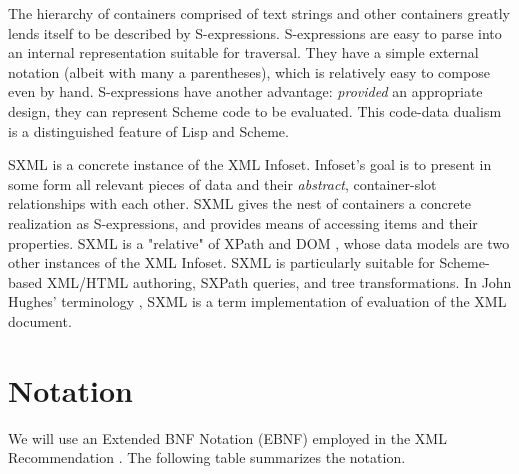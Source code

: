 \documentclass[10pt]{article}
\begin{document}
The hierarchy of containers comprised of text strings and other
containers greatly lends itself to be described by
S-expressions. S-expressions \cite{McCarthy} are easy to parse
into an internal representation suitable for traversal.  They have a
simple external notation (albeit with many a parentheses), which is
relatively easy to compose even by hand.  S-expressions have another
advantage: \emph{provided} an appropriate design, they can
represent Scheme code to be evaluated.  This code-data dualism is a
distinguished feature of Lisp and Scheme. 

SXML is a concrete instance of the XML Infoset. Infoset's goal is
to present in some form all relevant pieces of data and their \emph{abstract}, container-slot relationships with each other.  SXML
gives the nest of containers a concrete realization as S-expressions,
and provides means of accessing items and their properties. SXML is a
"relative" of XPath \cite{XPath} and DOM \cite{DOM},
whose data models are two other instances of the XML Infoset. SXML is
particularly suitable for Scheme-based XML/HTML authoring, SXPath
queries, and tree transformations. In John Hughes' terminology \cite{Hughes-PP}, SXML is a term implementation of evaluation of the XML
document.

\section{Notation}
We will use an Extended BNF Notation (EBNF) employed in the XML
Recommendation \cite{XML}. The following table summarizes the notation.
\end{document}
